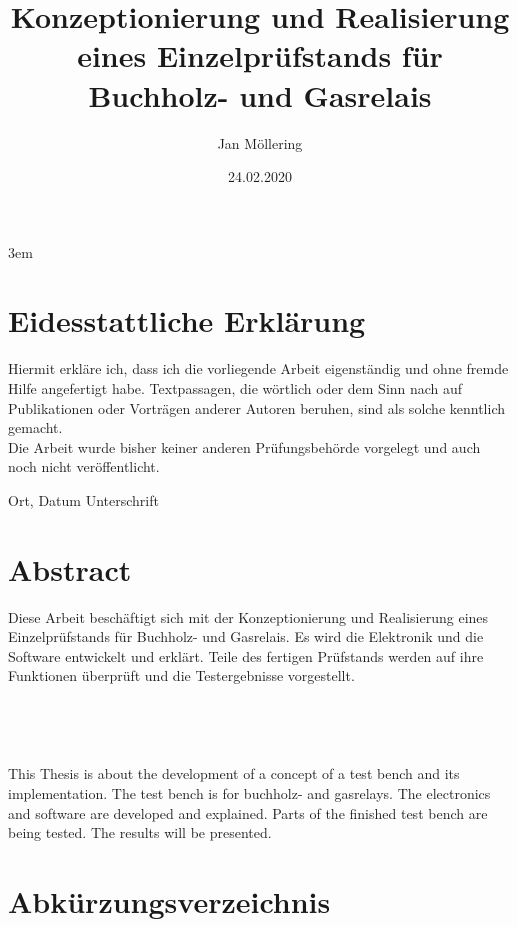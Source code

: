 \documentclass[12pt,a4paper,twoside]{report}
\title{Konzeptionierung und Realisierung eines Einzelprüfstands für Buchholz- und Gasrelais}
\author{Jan Möllering}
\date{24.02.2020}
\begin{document}
\emergencystretch 3em



\chapter*{Eidesstattliche Erklärung}
\thispagestyle{empty}
Hiermit erkläre ich, dass ich die vorliegende Arbeit eigenständig und ohne fremde Hilfe angefertigt habe. Textpassagen, die wörtlich oder dem Sinn nach auf Publikationen oder Vorträgen anderer Autoren beruhen, sind als solche kenntlich gemacht.
\\
\noindent
Die Arbeit wurde bisher keiner anderen Prüfungsbehörde vorgelegt und auch noch nicht veröffentlicht.

\vspace{4cm}

\hspace{2cm} Ort, Datum \hfill Unterschrift \hspace{2cm}

\chapter*{Abstract}
\thispagestyle{empty}
Diese Arbeit beschäftigt sich mit der Konzeptionierung und Realisierung eines Einzelprüfstands für Buchholz- und Gasrelais. Es wird die Elektronik und die Software entwickelt und erklärt. Teile des fertigen Prüfstands werden auf ihre Funktionen überprüft und die Testergebnisse vorgestellt.
\\
\\
\\
\\
\\
This Thesis is about the development of a concept of a test bench and its implementation. The test bench is for buchholz- and gasrelays. The electronics and software are developed and explained. Parts of the finished test bench are being tested. The results will be presented.

\setcounter{tocdepth}{1}
\tableofcontents
\thispagestyle{empty}
\newpage
{}


\listoftables
\newpage

\listoffigures

\chapter*{Abkürzungsverzeichnis}

\newpage
\end{document}
